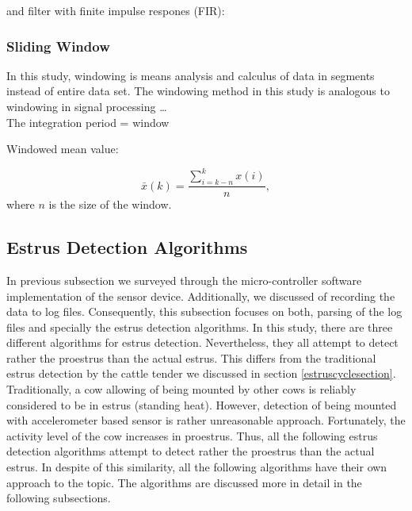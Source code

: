 \documentclass[english,12pt,a4paper,pdftex,elec,utf8]{aaltothesis}
\begin{document}
and filter with finite impulse respones (FIR):






\subsubsection{Sliding Window} \label{slidingwindowsection}

In this study, windowing is means analysis and calculus of data in segments instead of entire data set. The windowing method in this study is analogous to windowing in signal processing \cite{tan2007digital,miao2007signal} \dots \\

The integration period = window

Windowed mean value:

\begin{equation}
\bar{x}(k) = \frac{ \sum\limits^{k}_{i = k - n} x(i)}{n} \mathrm{,}
\end{equation} where $n$ is the size of the window.


\subsection{Estrus Detection Algorithms} \label{estrusdetectionalgorithmssection}

In previous subsection we surveyed through the micro-controller software implementation of the sensor device. Additionally, we discussed of recording the data to log files. Consequently, this subsection focuses on both, parsing of the log files and specially the estrus detection algorithms. In this study, there are three different algorithms for estrus detection. Nevertheless, they all attempt to detect rather the proestrus than the actual estrus. This differs from the traditional estrus detection by the cattle tender we discussed in section \ref{estruscyclesection}. Traditionally, a cow allowing of being mounted by other cows is reliably considered to be in estrus (standing heat). However, detection of being mounted with accelerometer based sensor is rather unreasonable approach. Fortunately, the activity level of the cow increases in proestrus. Thus, all the following estrus detection algorithms attempt to detect rather the proestrus than the actual estrus. In despite of this similarity, all the following algorithms have their own approach to the topic. The algorithms are discussed more in detail in the following subsections.  \\
\end{document}
